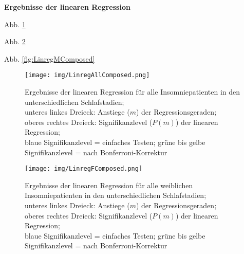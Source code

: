 



\textbf{Ergebnisse der linearen Regression}

Abb. \ref{fig:LinregAllComposed}

Abb. \ref{fig:LinregFComposed}

Abb. \ref{fig:LinregMComposed}




\begin{figure}[H]
	\centering
	\texttt{[image: img/LinregAllComposed.png]}
	\caption[Ergebnisse der linearen Regression für alle Insomniepatienten]{Ergebnisse der linearen Regression für alle Insomniepatienten in den unterschiedlichen Schlafstadien;\\unteres linkes Dreieck: Anstiege ($m$) der Regressionsgeraden;\\oberes rechtes Dreieck: Signifikanzlevel ($P(m)$) der linearen Regression;\\blaue Signifikanzlevel = einfaches Testen; grüne bis gelbe Signifikanzlevel = nach Bonferroni-Korrektur}
	\label{fig:LinregAllComposed}
\end{figure}




\begin{figure}[H]
	\centering
	\texttt{[image: img/LinregFComposed.png]}
	\caption[Ergebnisse der linearen Regression für alle weiblichen Insomniepatienten]{Ergebnisse der linearen Regression für alle weiblichen Insomniepatienten in den unterschiedlichen Schlafstadien;\\unteres linkes Dreieck: Anstiege ($m$) der Regressionsgeraden;\\oberes rechtes Dreieck: Signifikanzlevel ($P(m)$) der linearen Regression;\\blaue Signifikanzlevel = einfaches Testen; grüne bis gelbe Signifikanzlevel = nach Bonferroni-Korrektur}
	\label{fig:LinregFComposed}
\end{figure}




